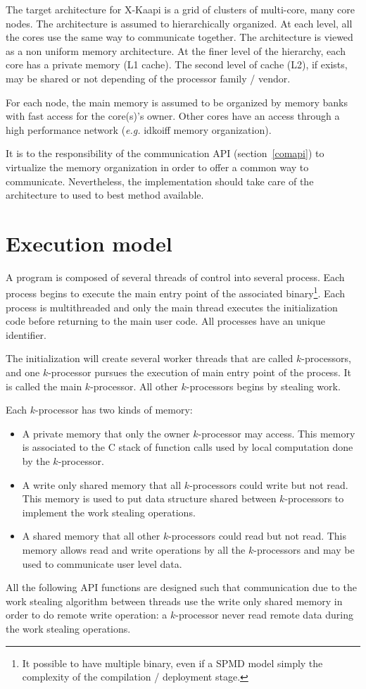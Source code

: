 \documentclass[12pt]{report}
\begin{document}
The target architecture for X-Kaapi is a grid of clusters of multi-core, many core nodes.
The architecture is assumed to hierarchically organized. At each level, all the cores use the same way to communicate together. The architecture is viewed as a non uniform memory architecture.
At the finer level of the hierarchy, each core has a private memory (L1 cache). The second level of cache  (L2), if exists, may be shared or not depending of the processor family / vendor. 

For each node, the main memory is assumed to be organized by memory banks with fast access for the core(s)'s owner. Other cores have an access through a high performance network (\textit{e.g.} idkoiff memory organization).

It is to the responsibility of the communication API (section~\ref{comapi}) to virtualize the memory organization in order to offer a common way to communicate. Nevertheless, the implementation should take care of the architecture to used to best method available.

\section{Execution model}
A program is composed of several threads of control into several process. 
Each process begins to execute the main entry point of the associated binary\footnote{It possible to have multiple binary, even if a SPMD model simply the complexity of the compilation / deployment stage.}. Each process is multithreaded and only the main thread  executes the initialization code before returning to the main user code. All processes have an unique identifier.

The initialization will create several worker threads that are called $k$-processors, and one $k$-processor pursues  the execution of main entry point of the process. It is called the main $k$-processor. All other $k$-processors begins by stealing work.

Each $k$-processor has two kinds of memory:
\begin{itemize}
\item A private memory that only the owner $k$-processor may access. This memory is associated to the C stack of function calls used by local computation done by the $k$-processor.
\item A write only shared memory that all $k$-processors could write but not read. This memory is used to put data structure shared between $k$-processors to implement the work stealing operations.
\item A shared memory that all other $k$-processors could read but not read. This memory allows read and write operations by all the $k$-processors and may be used to communicate user level data.
\end{itemize}
All the following API functions are designed such that communication due to the work stealing algorithm between threads use the write only shared memory in order to do remote write operation: a $k$-processor never read remote data during the work stealing operations.\\
\end{document}
